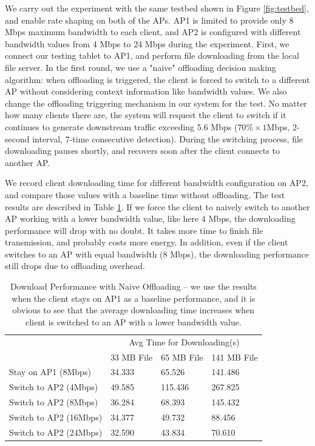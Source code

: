 \documentclass[english]{tktltiki}
\begin{document}
We carry out the experiment with the same testbed shown in Figure \ref{fig:testbed}, and enable rate shaping on both of the APs. AP1 is limited to provide only 8 Mbps maximum bandwidth to each client, and AP2 is configured with different bandwidth values from 4 Mbps to 24 Mbps during the experiment. First, we connect our testing tablet to AP1, and perform file downloading from the local file server. In the first round, we use a "naive" offloading decision making algorithm: when offloading is triggered, the client is forced to switch to a different AP without considering context information like bandwidth values. We also change the offloading triggering mechanism in our system for the test. No matter how many clients there are, the system will request the client to switch if it continues to generate downstream traffic exceeding 5.6 Mbps ($70\% \times 1$Mbps, 2-second interval, 7-time consecutive detection). During the switching process, file downloading pauses shortly, and recovers soon after the client connects to another AP.

We record client downloading time for different bandwidth configuration on AP2, and compare those values with a baseline time without offloading. The test results are described in Table \ref{tab:offloading}. If we force the client to naively switch to another AP working with a lower bandwidth value, like here 4 Mbps, the downloading performance will drop with no doubt. It takes more time to finish file transmission, and probably costs more energy. In addition, even if the client switches to an AP with equal bandwidth (8 Mbps), the downloading performance still drops due to offloading overhead.

\begin{table}[htbp]
\centering
\begin{tabular}{|p{130pt}|p{70pt}|p{70pt}|p{70pt}|}
  \hline
  & \multicolumn{3}{c|}{Avg Time for Downloading(s)} \\
  \cline{2-4}
  & 33 MB File & 65 MB File & 141 MB File \\
  \hline
  Stay on AP1 (8Mbps) & 34.333 & 65.526 & 141.486 \\
  \hline
  Switch to AP2 (4Mbps) & 49.585 & 115.436 & 267.825 \\
  \hline
  Switch to AP2 (8Mbps) & 36.284 & 68.393 & 145.432 \\
  \hline
  Switch to AP2 (16Mbps) & 34.377 & 49.732 & 88.456 \\
  \hline
  Switch to AP2 (24Mbps) & 32.590 & 43.834 & 70.610 \\
  \hline
\end{tabular}
\caption{Download Performance with Naive Offloading -- we use the results when the client stays on AP1 as a baseline performance, and it is obvious to see that the average downloading time increases when client is switched to an AP with a lower bandwidth value.}
\label{tab:offloading}
\end{table}
\end{document}
